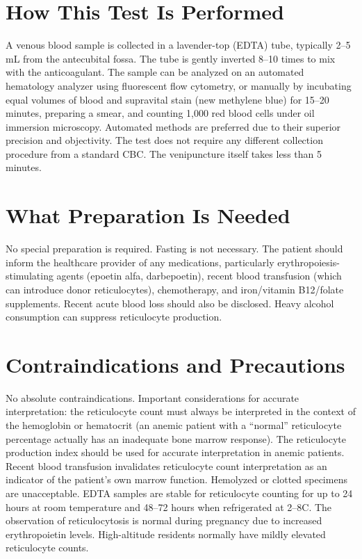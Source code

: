 \section*{How This Test Is Performed}
A venous blood sample is collected in a lavender-top (EDTA) tube, typically 2--5 mL from the antecubital fossa. The tube is gently inverted 8--10 times to mix with the anticoagulant. The sample can be analyzed on an automated hematology analyzer using fluorescent flow cytometry, or manually by incubating equal volumes of blood and supravital stain (new methylene blue) for 15--20 minutes, preparing a smear, and counting 1,000 red blood cells under oil immersion microscopy. Automated methods are preferred due to their superior precision and objectivity. The test does not require any different collection procedure from a standard CBC. The venipuncture itself takes less than 5 minutes.

\section*{What Preparation Is Needed}
No special preparation is required. Fasting is not necessary. The patient should inform the healthcare provider of any medications, particularly erythropoiesis-stimulating agents (epoetin alfa, darbepoetin), recent blood transfusion (which can introduce donor reticulocytes), chemotherapy, and iron/vitamin B12/folate supplements. Recent acute blood loss should also be disclosed. Heavy alcohol consumption can suppress reticulocyte production.

\section*{Contraindications and Precautions}
No absolute contraindications. Important considerations for accurate interpretation: the reticulocyte count must always be interpreted in the context of the hemoglobin or hematocrit (an anemic patient with a ``normal'' reticulocyte percentage actually has an inadequate bone marrow response). The reticulocyte production index should be used for accurate interpretation in anemic patients. Recent blood transfusion invalidates reticulocyte count interpretation as an indicator of the patient's own marrow function. Hemolyzed or clotted specimens are unacceptable. EDTA samples are stable for reticulocyte counting for up to 24 hours at room temperature and 48--72 hours when refrigerated at 2--8\textdegree{}C. The observation of reticulocytosis is normal during pregnancy due to increased erythropoietin levels. High-altitude residents normally have mildly elevated reticulocyte counts.


